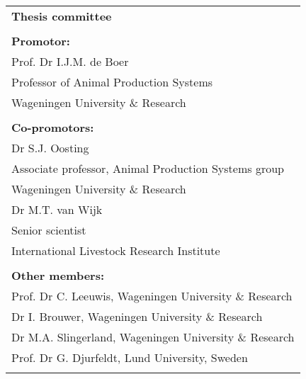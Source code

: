 \newpage
\thispagestyle{empty}
\vspace*{\fill}
\begin{tabular}{l}
    \textbf{Thesis committee}                                                                 \\
                                                                                              \\
    \textbf{Promotor:}                                                                        \\
    Prof. Dr I.J.M. de Boer                                                                    \\
    Professor of Animal Production Systems                                                   \\
    Wageningen University \& Research                                                         \\
                                                                                              \\
    \textbf{Co-promotors:}                                                                    \\
    Dr S.J. Oosting                                                                          \\
    Associate professor, Animal Production Systems group                                           \\
    Wageningen University \& Research                                                         \\

    Dr M.T. van Wijk                                                                         \\
    Senior scientist                                                                          \\
    International Livestock Research Institute                                                \\
                                                                                              \\
    \textbf{Other members:}                                                                   \\
    Prof. Dr C. Leeuwis, Wageningen University \& Research                                     \\
    Dr I. Brouwer, Wageningen University \& Research                                     \\
    Dr M.A. Slingerland, Wageningen University \& Research                                \\
    Prof. Dr G. Djurfeldt, Lund University, Sweden                                            \\
                                                                                              \\


\end{tabular}

